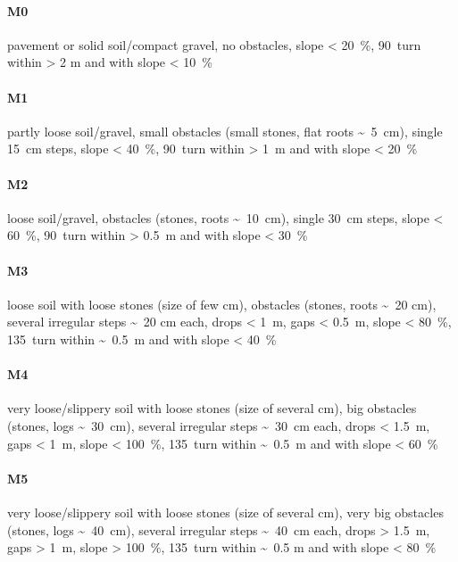 \documentclass[a4paper,oneside]{scrartcl}
\begin{document}
\paragraph{M0}
pavement or solid soil/compact gravel, no obstacles, slope < 20~\%,
90\textdegree\ turn within > 2 m and with slope < 10~\%

\paragraph{M1}
partly loose soil/gravel,
small obstacles (small stones, flat roots \textasciitilde\ 5~cm),
single 15~cm steps,
slope < 40~\%,
90\textdegree\ turn within > 1~m and with slope < 20~\%

\paragraph{M2}
loose soil/gravel,
obstacles (stones, roots \textasciitilde\ 10~cm),
single 30~cm steps,
slope < 60~\%,
90\textdegree\ turn within > 0.5~m and with slope < 30~\%

\paragraph{M3}
loose soil with loose stones (size of few cm),
obstacles (stones, roots \textasciitilde\ 20 cm),
several irregular steps \textasciitilde\ 20 cm each,
drops < 1~m, gaps < 0.5~m,
slope < 80~\%,
135\textdegree\ turn within \textasciitilde\ 0.5~m and with slope < 40~\%

\paragraph{M4}
very loose/slippery soil with loose stones (size of several cm),
big obstacles (stones, logs \textasciitilde\ 30~cm),
several irregular steps \textasciitilde\ 30~cm each,
drops < 1.5~m, gaps < 1~m,
slope < 100~\%,
135\textdegree\ turn within \textasciitilde\ 0.5~m and with slope < 60~\%

\paragraph{M5}
very loose/slippery soil with loose stones (size of several cm),
very big obstacles (stones, logs \textasciitilde\ 40~cm),
several irregular steps \textasciitilde\ 40~cm each,
drops > 1.5~m, gaps > 1~m,
slope > 100~\%,
135\textdegree\ turn within \textasciitilde\ 0.5 m and with slope < 80~\%
\end{document}
